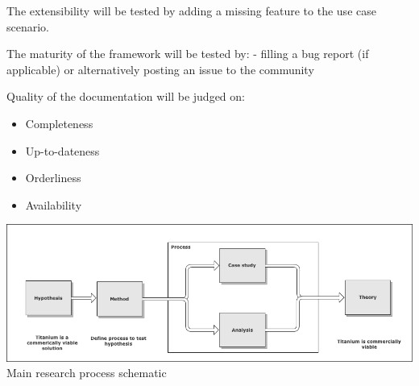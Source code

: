 The extensibility will be tested by adding a missing feature to the use case scenario.

The maturity of the framework will be tested by:
- filling a bug report (if applicable) or alternatively posting an issue to the community



Quality of the documentation will be judged on:
\begin{itemize}
	\item Completeness
	\item Up-to-dateness
	\item Orderliness
	\item Availability
\end{itemize}



\begin{centering}
\includegraphics[scale=0.5]{images/process.png}\\{Main research process schematic}\\
\end{centering}









